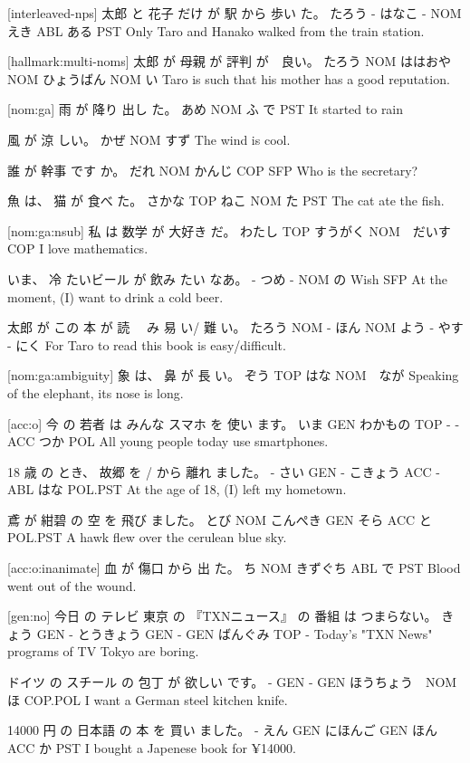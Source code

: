 [interleaved-nps]
太郎  と 花子  だけ が  駅  から 歩い  た。
たろう - はなこ -  NOM えき ABL ある  PST
Only Taro and Hanako walked from the train station.

[hallmark:multi-noms]
太郎  が   母親    が   評判      が　良い。
たろう NOM ははおや NOM ひょうばん NOM い
Taro is such that his mother has a good reputation.

[nom:ga]
雨  が   降り 出し た。
あめ NOM ふ   で PST
It started to rain

風  が   涼 しい。
かぜ NOM すず
The wind is cool.

誰  が   幹事   です か。
だれ NOM かんじ  COP SFP
Who is the secretary?

魚    は、 猫   が  食べ た。
さかな TOP ねこ NOM た  PST
The cat ate the fish.

[nom:ga:nsub]
私    は   数学    が   大好き だ。
わたし TOP すうがく NOM　だいす COP
I love mathematics.

いま、 冷  たいビール が  飲み たい なあ。
-    つめ -       NOM  の  Wish SFP
At the moment, (I) want to drink a cold beer.

太郎   が この 本   が  読 　み 易 い/ 難 い。
たろう NOM -  ほん NOM よう - やす - にく
For Taro to read this book is easy/difficult.

[nom:ga:ambiguity]
象   は、 鼻  が   長 い。
ぞう TOP はな NOM　なが
Speaking of the elephant, its nose is long.

[acc:o]
今   の  若者    は  みんな スマホ を  使い ます。
いま GEN わかもの TOP -    -     ACC つか POL
All young people today use smartphones.

18 歳  の とき、 故郷    を   / から 離れ ました。
- さい GEN -    こきょう ACC - ABL はな POL.PST
At the age of 18, (I) left my hometown.

鳶   が  紺碧     の  空  を  飛び ました。
とび NOM こんぺき GEN そら ACC と   POL.PST
A hawk flew over the cerulean blue sky.

[acc:o:inanimate]
血 が   傷口   から 出 た。
ち NOM きずぐち ABL で PST
Blood went out of the wound.

[gen:no]
今日   の  テレビ 東京  の 『TXNニュース』 の  番組   は  つまらない。
きょう GEN - とうきょう GEN -        GEN ばんぐみ TOP -
Today's "TXN News" programs of TV Tokyo are boring.

ドイツ の スチール の 包丁   が      欲しい です。
-    GEN -     GEN ほうちょう　NOM ほ   COP.POL
I want a German steel kitchen knife.

14000 円  の  日本語   の  本   を  買い ました。
-    えん GEN にほんご GEN ほん ACC か   PST
I bought a Japenese book for ¥14000.


